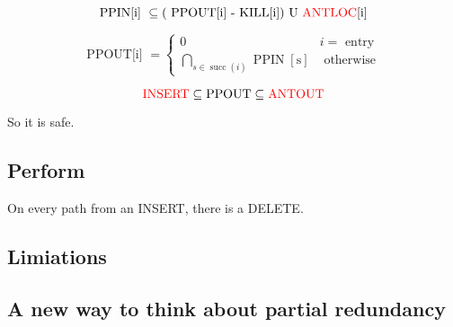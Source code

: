 $$
	\text { PPIN[i] } \subseteq(\text { PPOUT[i] - KILL[i]) U {\color{red}ANTLOC}[i] }
$$


$$
	\text { PPOUT[i] }=\left\{\begin{array}{cl}
		0                                                                      & i=\text { entry }   \\
		\bigcap_{s \in \operatorname{succ}(i)} \operatorname{PPIN}[\mathrm{s}] & \text { otherwise }
	\end{array}\right.
$$

$$
	{\color{red}\text{INSERT}} \subseteq \text{PPOUT} \subseteq {\color{red}\text{ANTOUT}}
$$

So it is safe.

\subsection{Perform}
On every path from an INSERT, there is a DELETE.


\subsection{Limiations}




\subsection{A new way to think about partial redundancy}


























